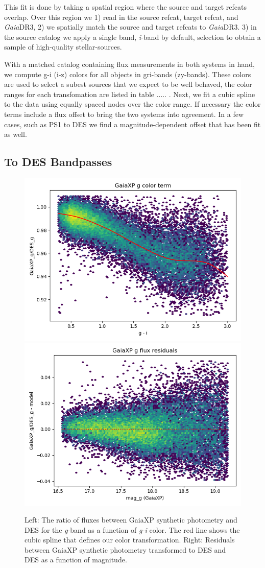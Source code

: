 This fit is done by taking a spatial region where the source and target refcats overlap. 
Over this region we 1) read in the source refcat, target refcat, and \emph{Gaia}DR3, 2) we spatially match the source and target refcats to \emph{Gaia}DR3. 3) in the source catalog we apply a single band, \textit{i}-band by default, selection to obtain a sample of high-quality stellar-sources.  

With a matched catalog containing flux measurements in both systems in hand, we compute g-i (i-z) colors for all objects in gri-bands (zy-bands). 
These colors are used to select a subest sources that we expect to be well behaved, the color ranges for each transfomation are listed in table ..... .
Next, we fit a cubic spline to the data using equally spaced nodes over the color range.
If necessary the color terms include a flux offset to bring the two systems into agreement. 
In a few cases, such as PS1 to DES we find a magnitude-dependent offset that has been fit as well.

\subsection{To DES Bandpasses}
\label{sec:todes}
\begin{figure}
    \includegraphics[width=0.49\linewidth]{./figures/color_terms/GaiaXP_to_DES_band_g_color_term.png}
    \includegraphics[width=0.49\linewidth]{./figures/color_terms/GaiaXP_to_DES_band_g_flux_residuals.png}
    \caption{Left: The ratio of fluxes between GaiaXP synthetic photometry and DES for the \textit{g}-band as a function of \textit{g-i} color. The red line shows the cubic spline that defines our color transformation.
    Right: Residuals between GaiaXP synthetic photometry transformed to DES and DES as a function of magnitude.}
    \label{fig:color-xp-g}
\end{figure}
